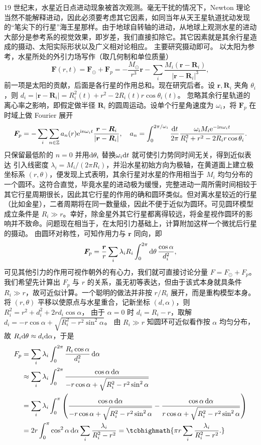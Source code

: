 19 世纪末，水星近日点进动现象被首次观测。毫无干扰的情况下，Newton 理论当然不能解释进动，因此必须要考虑其它因素，如同当年从天王星轨道扰动发现的“笔尖下的行星”海王星那样。由于地球自转轴的进动，从地球上观测水星的进动大部分是参考系的视觉效果，即岁差，我们直接扣除它。其它因素就是其余行星造成的摄动、太阳实际形状以及广义相对论相应。
主要研究摄动即可。
以太阳为参考，水星所处的外引力场写作（取几何制和单位质量）
\[\bm F(r,t)=\bm F_\odot+\bm F_p=-\frac{M_\odot}{r^3}\bm r-\sum_i\frac{M_i(\bm r-\bm R_i)}{|\bm r-\bm R_i|^3},\]
前一项是太阳的贡献，后面是各行星的作用总和。现在研究后者。设 $\bm r,\bm R_i$ 夹角 $\theta_i$，则 $d_i=|\bm r-\bm R_i|=R_i^2(t)+r^2-2R_i(t)r\cos\theta_i(t)$。
忽略其余行星轨道的离心率之影响，即假定做半径 $\bm R_i$ 的圆周运动。设单个行星角速度为 $\omega_i$，将 $\bm F_p$ 在时域上做 Fourier 展开
\[
\bm F_p=- \sum_i \sum_{n\in\mathbb{Z}} {{a_n}(r){\mathrm{e}^{\mathrm{i} n{\omega_i}t}}}\frac{\bm r-\bm R_i}{|\bm r-\bm R_i|},\quad a_n=\int_0^{2\pi/\omega_i}\frac{\dd t}{2\pi}{\frac{\omega_i M_i\mathrm{e}^{-\mathrm{i} n\omega_i t}}{{R_i^2 + r^2 - 2R_ir\cos \theta_i}}}.
\]
只保留最低阶的 $n=0$ 并用$\dd\theta_i$ 替换$\omega_i\dd t$ 就可使引力势同时间无关，得到近似表达
引入线密度 $\lambda_i=M_i/(2\pi R_i)$，并沿水星初始方向为极轴，在黄道面上建立极坐标系 $(r,\theta)$，便发现上式表明，其余行星对水星的作用相当于 $M_i$ 均匀分布的一个圆环。这符合直觉，毕竟水星的进动极为缓慢，完整进动一周所需时间相较于其它行星周期很长，因此其它行星的作用的确和圆环类似。但对离水星较近的行星（比如金星），二者周期将在同一数量级，因此不便于近似为圆环。可见圆环模型成立条件是 $R_i\gg r$。幸好，除金星外其它行星都离得较远，将金星视作圆环的影响并不致命。问题现在相当于，在太阳引力基础上，计算附加这样一个微扰后行星的摄动。
由圆环对称性，可知作用力与 $\bm r$ 同向，即
\[
\bm F_p= \frac{\bm r}{r}\sum_i  \lambda_iR_i\int_0^{2\pi }\dd{\theta}\frac{\cos\alpha}{ d_i^2},
\]
可见其他引力的作用可视作朝外的有心力，我们就可直接讨论分量 $F=F_\odot+F_p$。
我们希望先计算出 $F_p$ 与 $r$ 的关系，虽无初等表达，但由于该式本身就具条件 $R_i\gg r$，故可近似计算。一个聪明的做法并非按 $r/R_i$ 展开，而是重构模型本身。将 $(r,\theta)$ 平移以使原点与水星重合，记新坐标 $(d,\alpha)$，则 $R_i^2=r^2+d_i^2+2rd_i\cos\alpha$，
由于 $\alpha=0$ 时 $d_i=R_i-r$，取解 $d_i=-r\cos\alpha+\sqrt{R_i^2-r^2\sin^2\alpha}$。
由 $R_i\gg r$ 知圆环可近似看作按 $\alpha$ 均匀分布，故 $ R_i\dd\theta\approx d_i\dd\alpha$，于是
\begin{align}
    F_p&=\sum_i \lambda_i \int_0^{2\pi } \frac{R_i\cos\alpha}{d_i^2 }\d{\alpha}\nonumber\\
    &\approx\sum_i \lambda_i \int_0^{2\pi } \frac{\cos\alpha\d{\alpha}}{-r\cos\alpha+\sqrt{R_i^2-r^2\sin^2\alpha}}\nonumber\\
    &=\sum_i \lambda_i \int_0^{\pi } \left(\frac{\cos\alpha\d{\alpha}}{-r\cos\alpha+\sqrt{R_i^2-r^2\sin^2\alpha}}-\frac{\cos\alpha\d{\alpha}}{r\cos\alpha+\sqrt{R_i^2-r^2\sin^2\alpha}}\right)\nonumber\\
    &=2r \int_0^{\pi }\cos^2\alpha\d{\alpha} \sum_i \frac{\lambda_i}{R_i^2-r^2} = \tcbhighmath{\pi r\sum_i \frac{\lambda_i}{R_i^2-r^2}.}
\end{align}

